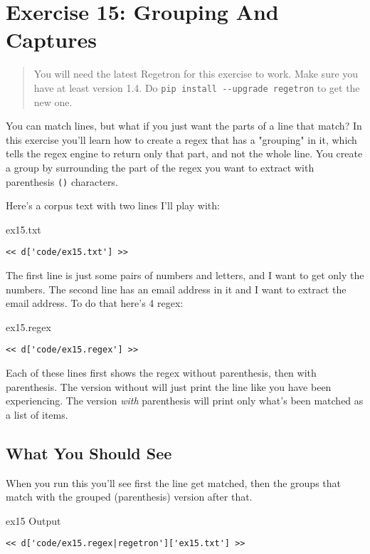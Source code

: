 \chapter{Exercise 15: Grouping And Captures}

\begin{quote}
You will need the latest Regetron for this exercise to work.  Make sure you have
at least version 1.4.  Do \verb|pip install --upgrade regetron| to get the new
one.
\end{quote}

You can match lines, but what if you just want the parts of a line that match?  
In this exercise you'll learn how to create a regex that has a "grouping" in it,
which tells the regex engine to return only that part, and not the whole line.
You create a group by surrounding the part of the regex you want to extract
with parenthesis \verb|()| characters.

Here's a corpus text with two lines I'll play with:

\begin{code}{ex15.txt}
\begin{Verbatim}
<< d['code/ex15.txt'] >>
\end{Verbatim}
\end{code}

The first line is just some pairs of numbers and letters, and I want to 
get only the numbers.  The second line has an email address in it and I
want to extract the email address.  To do that here's 4 regex:

\begin{code}{ex15.regex}
\begin{Verbatim}
<< d['code/ex15.regex'] >>
\end{Verbatim}
\end{code}

Each of these lines first shows the regex without parenthesis, then
with parenthesis.  The version without will just print the line like
you have been experiencing.  The version \emph{with} parenthesis
will print only what's been matched as a list of items.

\section{What You Should See}

When you run this you'll see first the line get matched, then the 
groups that match with the grouped (parenthesis) version after that.

\begin{code}{ex15 Output}
\begin{Verbatim}
<< d['code/ex15.regex|regetron']['ex15.txt'] >>
\end{Verbatim}
\end{code}

